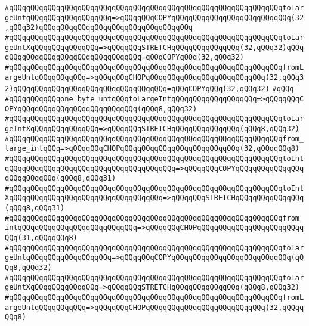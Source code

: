 \verb|#qQQqqQQqqQQqqQQqqQQqqQQqqQQqqQQqqQQqqQQqqQQqqQQqqQQqqQQqqQQqqQQqtoLargeUntqQQqqQQqqQQqqQQqqQQq=>qQQqqQQqCOPYqQQqqQQqqQQqqQQqqQQqqQQqqQQq(32,qQQq32)qQQqqQQqqQQqqQQqqQQqqQQqqQQqqQQqqQQq|\newline
\verb|#qQQqqQQqqQQqqQQqqQQqqQQqqQQqqQQqqQQqqQQqqQQqqQQqqQQqqQQqqQQqqQQqtoLargeUntXqQQqqQQqqQQqqQQq=>qQQqqQQqSTRETCHqQQqqQQqqQQqqQQq(32,qQQq32)qQQqqQQqqQQqqQQqqQQqqQQqqQQqqQQqqQQq=qQQqCOPYqQQq(32,qQQq32)|\newline
\verb|#qQQqqQQqqQQqqQQqqQQqqQQqqQQqqQQqqQQqqQQqqQQqqQQqqQQqqQQqqQQqqQQqfromLargeUntqQQqqQQqqQQq=>qQQqqQQqCHOPqQQqqQQqqQQqqQQqqQQqqQQqqQQq(32,qQQq32)qQQqqQQqqQQqqQQqqQQqqQQqqQQqqQQqqQQq=qQQqCOPYqQQq(32,qQQq32)|\newline
\verb|#qQQq|\newline
\verb|#qQQqqQQqqQQqone_byte_untqQQqtoLargeIntqQQqqQQqqQQqqQQqqQQq=>qQQqqQQqCOPYqQQqqQQqqQQqqQQqqQQqqQQqqQQq(qQQq8,qQQq32)|\newline
\verb|#qQQqqQQqqQQqqQQqqQQqqQQqqQQqqQQqqQQqqQQqqQQqqQQqqQQqqQQqqQQqqQQqtoLargeIntXqQQqqQQqqQQqqQQq=>qQQqqQQqSTRETCHqQQqqQQqqQQqqQQq(qQQq8,qQQq32)|\newline
\verb|#qQQqqQQqqQQqqQQqqQQqqQQqqQQqqQQqqQQqqQQqqQQqqQQqqQQqqQQqqQQqqQQqfrom_large_intqQQq=>qQQqqQQqCHOPqQQqqQQqqQQqqQQqqQQqqQQqqQQq(32,qQQqqQQq8)|\newline
\verb|#qQQqqQQqqQQqqQQqqQQqqQQqqQQqqQQqqQQqqQQqqQQqqQQqqQQqqQQqqQQqqQQqtoIntqQQqqQQqqQQqqQQqqQQqqQQqqQQqqQQqqQQqqQQq=>qQQqqQQqCOPYqQQqqQQqqQQqqQQqqQQqqQQqqQQq(qQQq8,qQQq31)|\newline
\verb|#qQQqqQQqqQQqqQQqqQQqqQQqqQQqqQQqqQQqqQQqqQQqqQQqqQQqqQQqqQQqqQQqtoIntXqQQqqQQqqQQqqQQqqQQqqQQqqQQqqQQqqQQq=>qQQqqQQqSTRETCHqQQqqQQqqQQqqQQq(qQQq8,qQQq31)|\newline
\verb|#qQQqqQQqqQQqqQQqqQQqqQQqqQQqqQQqqQQqqQQqqQQqqQQqqQQqqQQqqQQqqQQqfrom_intqQQqqQQqqQQqqQQqqQQqqQQqqQQq=>qQQqqQQqCHOPqQQqqQQqqQQqqQQqqQQqqQQqqQQq(31,qQQqqQQq8)|\newline
\verb|#qQQqqQQqqQQqqQQqqQQqqQQqqQQqqQQqqQQqqQQqqQQqqQQqqQQqqQQqqQQqqQQqtoLargeUntqQQqqQQqqQQqqQQqqQQq=>qQQqqQQqCOPYqQQqqQQqqQQqqQQqqQQqqQQqqQQq(qQQq8,qQQq32)|\newline
\verb|#qQQqqQQqqQQqqQQqqQQqqQQqqQQqqQQqqQQqqQQqqQQqqQQqqQQqqQQqqQQqqQQqtoLargeUntXqQQqqQQqqQQqqQQq=>qQQqqQQqSTRETCHqQQqqQQqqQQqqQQq(qQQq8,qQQq32)|\newline
\verb|#qQQqqQQqqQQqqQQqqQQqqQQqqQQqqQQqqQQqqQQqqQQqqQQqqQQqqQQqqQQqqQQqfromLargeUntqQQqqQQqqQQq=>qQQqqQQqCHOPqQQqqQQqqQQqqQQqqQQqqQQqqQQq(32,qQQqqQQq8)|\newline
